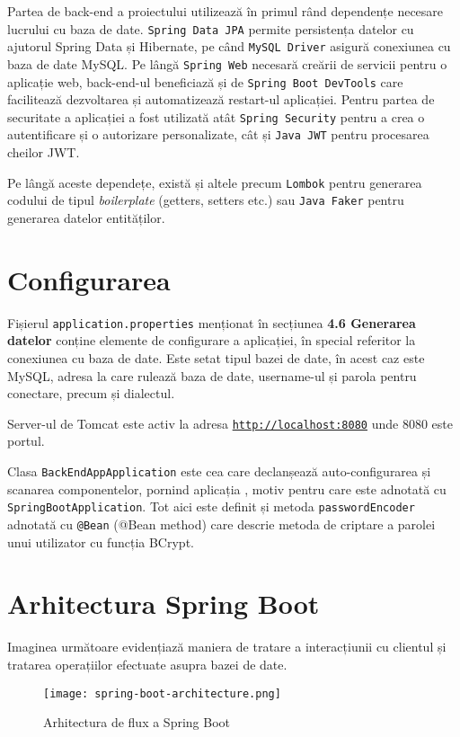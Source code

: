 Partea de back-end a proiectului \thesistitle utilizează în primul rând dependențe necesare lucrului cu baza de date. \texttt{Spring Data JPA} permite persistența datelor cu ajutorul Spring Data și Hibernate, pe când \texttt{MySQL Driver} asigură conexiunea cu baza de date MySQL. Pe lângă \texttt{Spring Web} necesară creării de servicii pentru o aplicație web, back-end-ul beneficiază și de \texttt{Spring Boot DevTools} care facilitează dezvoltarea și automatizează restart-ul aplicației. Pentru partea de securitate a aplicației a fost utilizată atât \texttt{Spring Security} pentru a crea o autentificare și o autorizare personalizate, cât și \texttt{Java JWT} pentru procesarea cheilor JWT.

Pe lângă aceste dependețe, există și altele precum \texttt{Lombok} pentru generarea codului de tipul \textit{boilerplate} (getters, setters etc.) sau \texttt{Java Faker} pentru generarea datelor entităților.

\section{Configurarea}

Fișierul \texttt{application.properties} menționat în secțiunea \textbf{4.6 Generarea datelor} conține elemente de configurare a aplicației, în special referitor la conexiunea cu baza de date. Este setat tipul bazei de date, în acest caz este MySQL, adresa la care rulează baza de date, username-ul și parola pentru conectare, precum și dialectul.

Server-ul de Tomcat este activ la adresa \texttt{\url{http://localhost:8080}} unde 8080 este portul.

Clasa \texttt{BackEndAppApplication} este cea care declanșează auto-configurarea și scanarea componentelor, pornind aplicația \cite{spring-boot-app-class}, motiv pentru care este adnotată cu \texttt{SpringBootApplication}. Tot aici este definit și metoda \texttt{passwordEncoder} adnotată cu \texttt{@Bean} (@Bean method) care descrie metoda de criptare a parolei unui utilizator cu funcția BCrypt.

\section{Arhitectura Spring Boot}

Imaginea următoare evidențiază maniera de tratare a interacțiunii cu clientul și tratarea operațiilor efectuate asupra bazei de date.

\begin{figure}[H]
	\centering
	\texttt{[image: spring-boot-architecture.png]}
	\caption{Arhitectura de flux a Spring Boot}
\end{figure}

